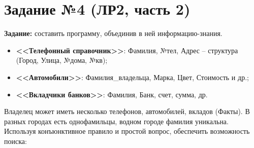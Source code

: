 \begin{figure}[H]
\end{figure}

\section{Задание №4 (ЛР2, часть 2)}
\textbf{Задание:} составить программу, объединив в ней информацию-знания.
\begin{itemize}
	\item \textbf{<<Телефонный справочник>>}: Фамилия, №тел, Адрес -- структура (Город, Улица, №дома, №кв);
	\item \textbf{<<Автомобили>>}: Фамилия\_владельца, Марка, Цвет, Стоимость и др.;
	\item \textbf{<<Вкладчики банков>>}: Фамилия, Банк, счет, сумма, др.
\end{itemize}
Владелец может иметь несколько телефонов, автомобилей, вкладов (Факты). В разных городах есть однофамильцы, водном городе фамилия уникальна.
Используя конъюнктивное правило и простой вопрос, обеспечить возможность поиска:


